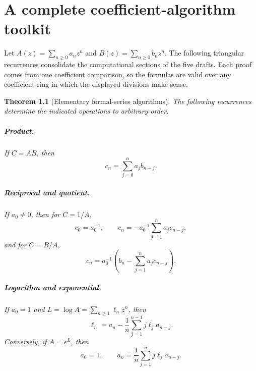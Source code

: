 \documentclass[11pt,a4paper,oneside,openany]{book}
\newtheorem{theorem}{Theorem}[chapter]
\theoremstyle{definition}
\theoremstyle{remark}
\begin{document}
\chapter{A complete coefficient-algorithm toolkit}

Let $A(z)=\sum_{n\ge0}a_nz^n$ and $B(z)=\sum_{n\ge0}b_nz^n$. The following
triangular recurrences consolidate the computational sections of the five
drafts. Each proof comes from one coefficient comparison, so the formulas are
valid over any coefficient ring in which the displayed divisions make sense.

\begin{theorem}[Elementary formal-series algorithms]
\label{unif:thm-series-algorithms}
The following recurrences determine the indicated operations to arbitrary
order.

\paragraph{Product.} If $C=AB$, then
\begin{equation}\label{unif:eq-cauchy-product}
 c_n=\sum_{j=0}^{n}a_jb_{n-j}.
\end{equation}

\paragraph{Reciprocal and quotient.} If $a_0\ne0$, then for $C=1/A$,
\begin{equation}\label{unif:eq-reciprocal-recursion}
 c_0=a_0^{-1},\qquad
 c_n=-a_0^{-1}\sum_{j=1}^{n}a_jc_{n-j},
\end{equation}
and for $C=B/A$,
\begin{equation}\label{unif:eq-quotient-recursion}
 c_n=a_0^{-1}\left(b_n-\sum_{j=1}^{n}a_jc_{n-j}\right).
\end{equation}

\paragraph{Logarithm and exponential.} If $a_0=1$ and
$L=\log A=\sum_{n\ge1}\ell_nz^n$, then
\begin{equation}\label{unif:eq-log-recursion}
 \ell_n=a_n-\frac1n\sum_{j=1}^{n-1}j\ell_j a_{n-j}.
\end{equation}
Conversely, if $A=e^L$, then
\begin{equation}\label{unif:eq-exp-recursion}
 a_0=1,\qquad a_n=\frac1n\sum_{j=1}^{n}j\ell_j a_{n-j}.
\end{equation}


\end{theorem}
\end{document}
